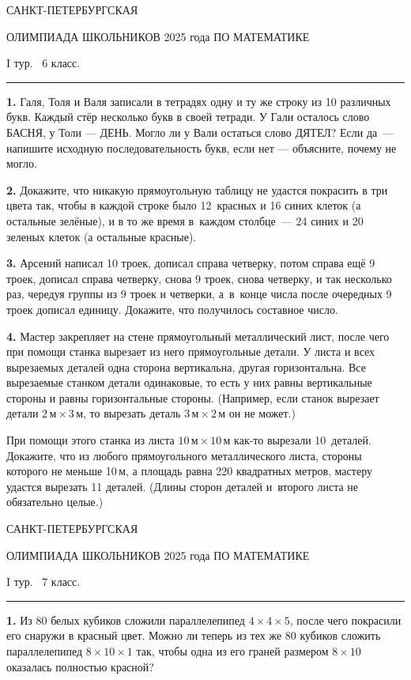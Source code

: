 \documentclass[12pt,a4paper]{article}
\def\q#1.{{\bf #1. }}
\begin{document}
\centerline{\sc САНКТ-ПЕТЕРБУРГСКАЯ}
\centerline{\sc ОЛИМПИАДА ШКОЛЬНИКОВ 2025 года ПО МАТЕМАТИКЕ}
\centerline{\sc I тур. \ 6 класс.}
\medskip
\hrule
\bigskip

\q1. Галя, Толя и Валя записали в тетрадях одну и ту же строку из 10 различных букв. Каждый стёр несколько букв в своей тетради. У Гали осталось слово БАСНЯ, у Толи --- ДЕНЬ. Могло ли у Вали остаться слово ДЯТЕЛ? Если да~--- напишите исходную последовательность букв, если нет --- объясните, почему не могло.

\q2. Докажите, что никакую прямоугольную таблицу не удастся покрасить в три цвета так,
чтобы в каждой строке было 12~красных и 16 синих клеток (а остальные зелёные), и в то же время в~каждом столбце~--- 24 синих и 20 зеленых клеток (а остальные красные).

\q3. Арсений написал 10 троек, дописал справа четверку, потом справа ещё 9 троек, дописал справа четверку, снова 9 троек, снова четверку, и так несколько раз, чередуя группы из 9 троек и четверки, а~в~конце числа после очередных 9 троек дописал единицу. Докажите, что получилось составное число. 

\q4. Мастер закрепляет на стене прямоугольный металлический лист, после чего при помощи станка вырезает из него прямоугольные детали. У листа и всех вырезаемых деталей одна сторона вертикальна, другая горизонтальна. Все вырезаемые станком детали одинаковые, то есть у них равны вертикальные стороны и равны горизонтальные стороны. (Например, если станок вырезает детали $2\,\text{м}\times 3$\,м, то вырезать деталь $3\,\text{м}\times 2$\,м он не может.)

При помощи этого станка из листа $10\,\text{м}\times 10\,\text{м}$ как-то вырезали 10~деталей. Докажите, что из любого прямоугольного металлического листа, стороны которого не меньше 10\,м, а площадь равна 220 квадратных метров, мастеру удастся вырезать 11 деталей. (Длины сторон деталей и~второго листа не обязательно целые.)


\clearpage

\centerline{\sc САНКТ-ПЕТЕРБУРГСКАЯ}
\centerline{\sc ОЛИМПИАДА ШКОЛЬНИКОВ 2025 года ПО МАТЕМАТИКЕ}
\centerline{\sc I тур. \ 7 класс.}
\medskip
\hrule
\bigskip

\q1. Из $80$ белых кубиков сложили параллелепипед $4\times 4\times 5$, после чего 
покрасили его снаружи в красный цвет.
Можно ли теперь из тех же 80 кубиков сложить параллелепипед $8\times 10\times 1$ так, чтобы одна из его граней размером $8\times 10$ оказалась полностью красной?
\end{document}
